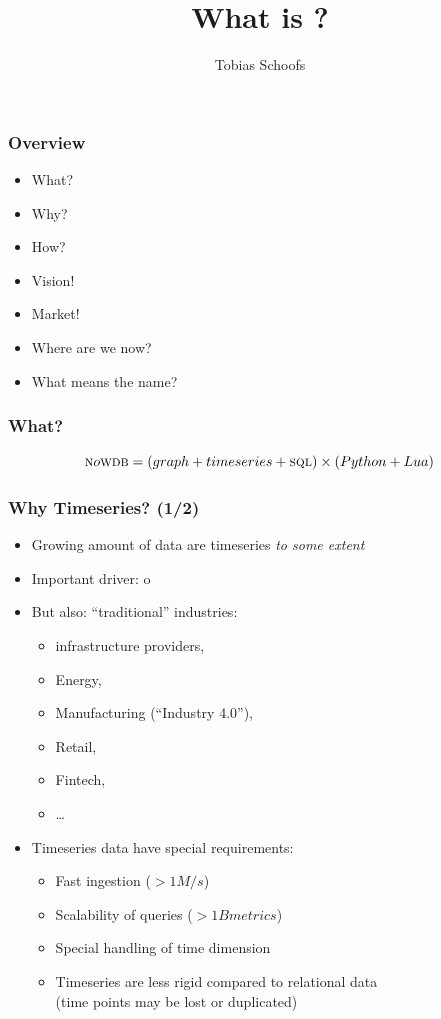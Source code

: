 \documentclass[mathserif,usenames,dvipsnames]{beamer}
\title{What is \nowdb?}
\author{Tobias Schoofs}
\begin{document}
\frame{\titlepage}

\begin{frame}
\frametitle{Overview}
\begin{itemize}
\item What?
\item Why?
\item How?
\item Vision!
\item Market!
\item Where are we now?
\item What means the name?
\end{itemize}
\end{frame}

\begin{frame}
\frametitle{What?}
\begin{equation*}
\textsc{n}o\textsc{wdb} = (graph +  timeseries + \textsc{sql}) \times (Python + Lua)
\end{equation*}
\end{frame}

\begin{frame}
\frametitle{Why Timeseries? (1/2)}
\begin{itemize}
\item Growing amount of data are timeseries \emph{to some extent}
\item Important driver: o
\item But also: ``traditional'' industries:
      \begin{itemize} 
      \item {} infrastructure providers,
      \item Energy,
      \item Manufacturing (``Industry 4.0''),
      \item Retail,
      \item Fintech,
      \item \dots
      \end{itemize}
\item Timeseries data have special requirements:
      \begin{itemize}
      \item Fast ingestion ($> 1M/s$)
      \item Scalability of queries ($> 1B metrics$)
      \item Special handling of time dimension
      \item Timeseries are less rigid compared to relational data\\
            (time points may be lost or duplicated)
      \end{itemize}
\end{itemize}
\end{frame}
\end{document}
